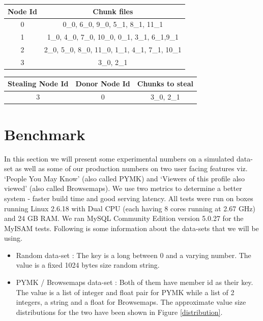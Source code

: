 \documentclass[10pt,twocolumn,preprint,natbib,authoryear]{sigplanconf}
\begin{document}
\begin{center}
    \begin{tabular}{ | c | c | }
    \hline
    Node Id & Chunk files \\ \hline
    0 &  	0\_0, 6\_0, 9\_0,      			5\_1, 8\_1, 11\_1 			\\
   	1 &   	1\_0, 4\_0, 7\_0, 10\_0,      	0\_1, 3\_1, 6\_1,9\_1  		\\
   	2 &    	2\_0, 5\_0, 8\_0, 11\_0,    	1\_1, 4\_1, 7\_1, 10\_1		\\
   	3 &   	3\_0,                         	2\_1 						\\
\hline
    \end{tabular}
\end{center}


\begin{center}
    \begin{tabular}{ | c | c | c | }
    \hline
    Stealing Node Id & Donor Node Id & Chunks to steal \\ \hline
    3 &  0 & 3\_0, 2\_1	\\
\hline
    \end{tabular}
\end{center}




\section{Benchmark}
\label{sec:benchmark}

In this section we will present some experimental numbers on a simulated data-set as well as some of our production numbers on two user facing features viz. `People You May Know' (also called PYMK) and `Viewers of this profile also viewed' (also called Browsemaps). We use two metrics to determine a better system - faster build time and good serving latency. All tests were run on boxes running Linux 2.6.18 with Dual CPU (each having 8 cores running at 2.67 GHz) and 24 GB RAM. We ran MySQL Community Edition version 5.0.27 for the MyISAM tests. Following is some information about the data-sets that we will be using. 

\begin{itemize}
	\item Random data-set : The key is a long between 0 and a varying number. The value is a fixed 1024 bytes size random string. 
	\item PYMK / Browsemaps data-set : Both of them have member id as their key. The value is a list of integer and float pair for PYMK while a list of 2 integers, a string and a float for Browsemaps. The approximate value size distributions for the two have been shown in Figure \ref{distribution}.  
\end{itemize}
\end{document}
